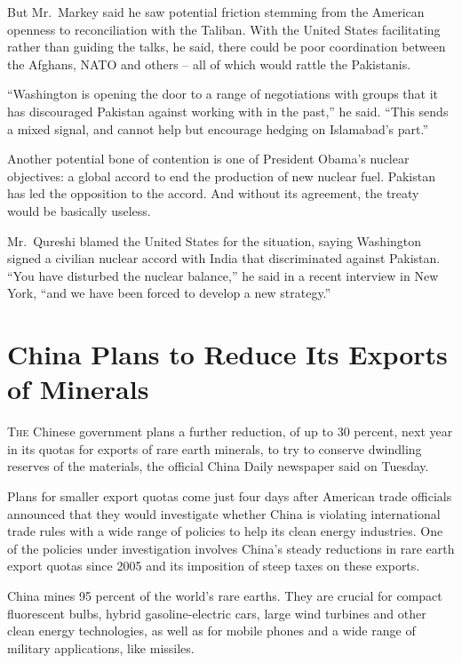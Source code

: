 ﻿\documentclass[12pt]{article}
\begin{document}
But Mr.~Markey said he saw potential friction stemming from the American openness to reconciliation
with the Taliban. With the United States facilitating rather than guiding the talks, he said, there
could be poor coordination between the Afghans, NATO and others -- all of which would rattle the
Pakistanis.

``Washington is opening the door to a range of negotiations with groups that it has discouraged
Pakistan against working with in the past,'' he said. ``This sends a mixed signal, and cannot help
but encourage hedging on Islamabad's part.''

Another potential bone of contention is one of President Obama's nuclear objectives: a global accord
to end the production of new nuclear fuel. Pakistan has led the opposition to the accord. And
without its agreement, the treaty would be basically useless.

Mr.~Qureshi blamed the United States for the situation, saying Washington signed a civilian nuclear
accord with India that discriminated against Pakistan. ``You have disturbed the nuclear balance,''
he said in a recent interview in New York, ``and we have been forced to develop a new strategy.''

\section{China Plans to Reduce Its Exports of Minerals}

\lettrine{T}{he} Chinese government plans a further reduction, of up to 30
percent, next year in its quotas for exports of rare earth minerals, to try to conserve dwindling
reserves of the materials, the official China Daily newspaper said on Tuesday.

Plans for smaller export quotas come just four days after American trade officials announced that
they would investigate whether China is violating international trade rules with a wide range of
policies to help its clean energy industries. One of the policies under investigation involves
China's steady reductions in rare earth export quotas since 2005 and its imposition of steep taxes
on these exports.

China mines 95 percent of the world's rare earths. They are crucial for compact fluorescent bulbs,
hybrid gasoline-electric cars, large wind turbines and other clean energy technologies, as well as
for mobile phones and a wide range of military applications, like missiles.
\end{document}
